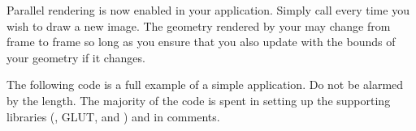 Parallel rendering is now enabled in your application.  Simply call
 every time you wish to draw a new image.  The
geometry rendered by your  may change from frame to
frame so long as you ensure that you also update \IceT with the bounds of
your geometry if it changes.

The following code is a full example of a simple \IceT application.  Do not
be alarmed by the length.  The majority of the code is spent in setting up
the supporting libraries (\OpenGL, GLUT, and \MPI) and in
comments.

